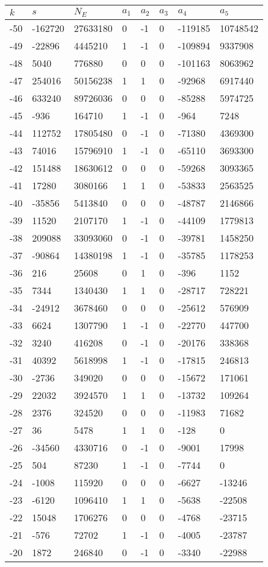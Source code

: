 \documentclass{amsart}
\begin{document}
\begin{longtable}{|l|l|l|lllll|}
\hline
$k$ & $s$ & $N_E$ & $a_1$ & $a_2$ & $a_3$ & $a_4$ & $a_5$\\
\hline
-50&-162720&27633180&0&-1&0&-119185&10748542\\
-49&-22896&4445210&1&-1&0&-109894&9337908\\
-48&5040&776880&0&0&0&-101163&8063962\\
-47&254016&50156238&1&1&0&-92968&6917440\\
-46&633240&89726036&0&0&0&-85288&5974725\\
-45&-936&164710&1&-1&0&-964&7248\\
-44&112752&17805480&0&-1&0&-71380&4369300\\
-43&74016&15796910&1&-1&0&-65110&3693300\\
-42&151488&18630612&0&0&0&-59268&3093365\\
-41&17280&3080166&1&1&0&-53833&2563525\\
-40&-35856&5413840&0&0&0&-48787&2146866\\
-39&11520&2107170&1&-1&0&-44109&1779813\\
-38&209088&33093060&0&-1&0&-39781&1458250\\
-37&-90864&14380198&1&-1&0&-35785&1178253\\
-36&216&25608&0&1&0&-396&1152\\
-35&7344&1340430&1&1&0&-28717&728221\\
-34&-24912&3678460&0&0&0&-25612&576909\\
-33&6624&1307790&1&-1&0&-22770&447700\\
-32&3240&416208&0&-1&0&-20176&338368\\
-31&40392&5618998&1&-1&0&-17815&246813\\
-30&-2736&349020&0&0&0&-15672&171061\\
-29&22032&3924570&1&1&0&-13732&109264\\
-28&2376&324520&0&0&0&-11983&71682\\
-27&36&5478&1&1&0&-128&0\\
-26&-34560&4330716&0&-1&0&-9001&17998\\
-25&504&87230&1&-1&0&-7744&0\\
-24&-1008&115920&0&0&0&-6627&-13246\\
-23&-6120&1096410&1&1&0&-5638&-22508\\
-22&15048&1706276&0&0&0&-4768&-23715\\
-21&-576&72702&1&-1&0&-4005&-23787\\
-20&1872&246840&0&-1&0&-3340&-22988\\

\end{longtable}
\end{document}
